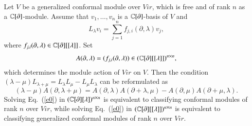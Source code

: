 \documentclass[12pt]{amsart}
\begin{document}

Let $V$ be a generalized conformal module over $Vir$, which is free and of rank $n$ as a $\mathbb{C}[\partial]$-module.
Assume that $v_1,\ldots,v_n$ is a $\mathbb{C}[\partial]$-basis of $V$ and
$$L_\lambda v_i=\sum_{j=1}^n f_{j,i}(\partial,\lambda)v_j,$$
where $f_{j,i}(\partial,\lambda)\in \mathbb{C}[\partial][[\lambda]]$.
Set
$$A(\partial,\lambda)=(f_{j,i}(\partial,\lambda))\in (\mathbb{C}[\partial][[\lambda]])^{n\times n},$$
 which determines the module action of $Vir$ on $V$. 
Then the condition $(\lambda-\mu)L_{\lambda+\mu}=L_\lambda L_\mu-L_\mu L_\lambda$ can be
reformulated as
\begin{equation}\label{e0}
(\lambda-\mu)A(\partial, \lambda+\mu)=A(\partial, \lambda)A(\partial+\lambda, \mu)
-A(\partial, \mu)A(\partial+\mu, \lambda).
\end{equation}
Solving Eq.~(\ref{e0}) in $(\mathbb{C}[\partial][\lambda])^{n\times n}$ is equivalent
to classifying conformal modules of rank $n$ over $Vir$, %
while
solving Eq.~(\ref{e0}) in $(\mathbb{C}[\partial][[\lambda]])^{n\times n}$ is equivalent
to classifying generalized conformal modules of rank $n$ over $Vir$.

\end{document}
